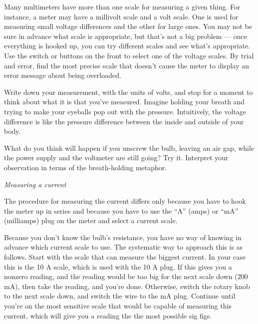 Many multimeters have more than one scale for
measuring a given thing. For instance, a meter may have a
millivolt scale and a volt scale. One is used for measuring
small voltage differences and the other for large ones. You may not
be sure in advance what scale is appropriate, but that's not
a big problem --- once everything is hooked up, you can try
different scales and see what's appropriate. Use the switch
or buttons on the front to select one of the voltage scales.
By trial and error, find the most precise scale that doesn't
cause the meter to display an error message about being overloaded.

Write down your measurement, with the units of volts, and stop
for a moment to think about what it is that you've measured.
Imagine holding your breath and trying to make your eyeballs
pop out with the pressure. 
Intuitively, the voltage difference is like the pressure difference
between the inside and outside of your body.

What do you think will happen if you unscrew the bulb, leaving
an air gap, while the
power supply and the voltmeter are still going? Try it.
Interpret your observation in terms of the breath-holding
metaphor.

\emph{Measuring a current}

The procedure for measuring the current differs only because
you have to hook the meter up in series and because you have
to use the ``A'' (amps) or ``mA'' (milliamps) plug on the meter and select a current
scale.

Because you don't know the bulb's resistance, you have no way of knowing
in advance which current scale to use. The systematic way to approach this
is as follows. Start with the scale that can measure the biggest current. In
your case this is the 10 A scale, which is used with the 10 A plug. If this
gives you a nonzero reading, and the reading would be too big for the next scale
down (200 mA), then take the reading, and you're done. Otherwise, switch the
rotary knob to the next scale down, and switch the wire to the mA plug. Continue
until you're on the most sensitive scale that would be capable of measuring this
current, which will give you a reading the the most possible sig figs.

